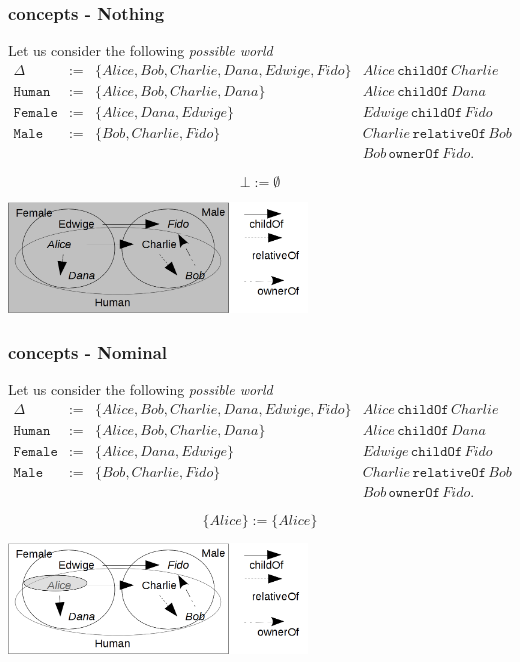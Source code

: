 \documentclass[8pt]{beamer}
\newcommand{\Human}{\mathtt{Human}}
\newcommand{\Male}{\mathtt{Male}}
\newcommand{\Female}{\mathtt{Female}}
\newcommand{\relative}{\mathtt{relativeOf}}
\newcommand{\child}{\mathtt{childOf}}
\newcommand{\owner}{\mathtt{ownerOf}}
\newcommand{\Alice}{Alice}
\newcommand{\Bob}{Bob}
\newcommand{\Charlie}{Charlie}
\newcommand{\Dana}{Dana}
\newcommand{\Edwige}{Edwige}
\newcommand{\Fido}{Fido}
\begin{document}
\begin{frame}
 \frametitle{\elplusplus concepts - Nothing}
 Let us consider the following \emph{possible world}
 \[
 \begin{array}{rcl|l}
  \Delta & := & \{ \Alice, \Bob, \Charlie, \Dana, \Edwige, \Fido \} & \Alice\,\child\,\Charlie \\
  \Human & := & \{ \Alice, \Bob, \Charlie, \Dana \} & \Alice\,\child\,\Dana\\
  \Female & := & \{ \Alice, \Dana, \Edwige \} & \Edwige\,\child\,\Fido\\
  \Male & := & \{ \Bob, \Charlie, \Fido \} & \Charlie\,\relative\,\Bob \\
  & & & \Bob\,\owner\,\Fido .
 \end{array}
\]

\[
 \bot := \emptyset
\]

 \begin{center}
  \includegraphics[width=300px, keepaspectratio]{images/extop_big.png}  
 \end{center}
\end{frame}

\begin{frame}
 \frametitle{\elplusplus concepts - Nominal}
 Let us consider the following \emph{possible world}
 \[
 \begin{array}{rcl|l}
  \Delta & := & \{ \Alice, \Bob, \Charlie, \Dana, \Edwige, \Fido \} & \Alice\,\child\,\Charlie \\
  \Human & := & \{ \Alice, \Bob, \Charlie, \Dana \} & \Alice\,\child\,\Dana\\
  \Female & := & \{ \Alice, \Dana, \Edwige \} & \Edwige\,\child\,\Fido\\
  \Male & := & \{ \Bob, \Charlie, \Fido \} & \Charlie\,\relative\,\Bob \\
  & & & \Bob\,\owner\,\Fido .
 \end{array}
\]

\[
 \{ \Alice \} := \{ \Alice \}
\]

 \begin{center}
  \includegraphics[width=300px, keepaspectratio]{images/exsing_big.png}  
 \end{center}
\end{frame}
\end{document}
